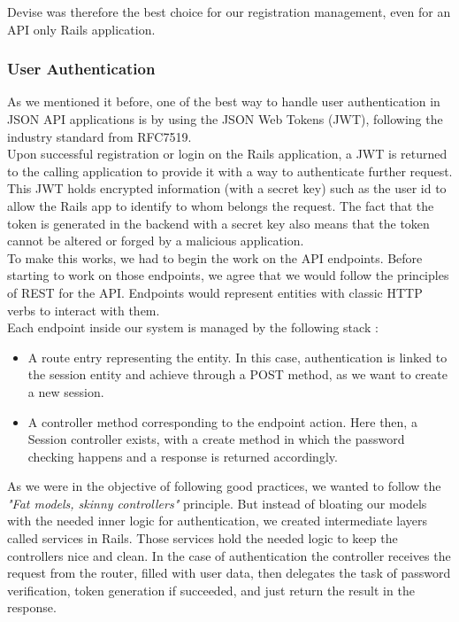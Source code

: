 \documentclass{eplmastersthesis}
\begin{document}
          Devise was therefore the best choice for our registration management,
          even for an API only Rails application.

        \subsubsection{User Authentication}

          As we mentioned it before, one of the best way to handle user
          authentication in JSON API applications is by using the JSON Web
          Tokens (JWT), following the industry standard from RFC7519.\\

          Upon successful registration or login on the Rails application, a
          JWT is returned to the calling application to provide it with a way
          to authenticate further request. This JWT holds encrypted
          information (with a secret key) such as the user id to allow the Rails
          app to identify to whom belongs the request. The fact that the token
          is generated in the backend with a secret key also means that the
          token cannot be altered or forged by a malicious application.\\

          To make this works, we had to begin the work on the API endpoints.
          Before starting to work on those endpoints, we agree that we would
          follow the principles of REST \cite{rest} for the API. Endpoints would
          represent entities with classic HTTP verbs to interact with them.\\

          Each endpoint inside our system is managed by the following stack :

          \begin{itemize}
            \item A route entry representing the entity. In this case,
            authentication is linked to the session entity and achieve through
            a POST method, as we want to create a new session.
            \item A controller method corresponding to the endpoint action.
            Here then, a Session controller exists, with a create method in
            which the password checking happens and a response is returned
            accordingly.
          \end{itemize}

          As we were in the objective of following good practices, we wanted
          to follow the \textit{"Fat models, skinny controllers"} principle.
          But instead of bloating our models with the needed inner logic for
          authentication, we created intermediate layers called services
          in Rails. Those services hold the needed logic to keep the controllers
          nice and clean. In the case of authentication the controller receives
          the request from the router, filled with user data, then delegates
          the task of password verification, token generation if succeeded,
          and just return the result in the response.\\
\end{document}
